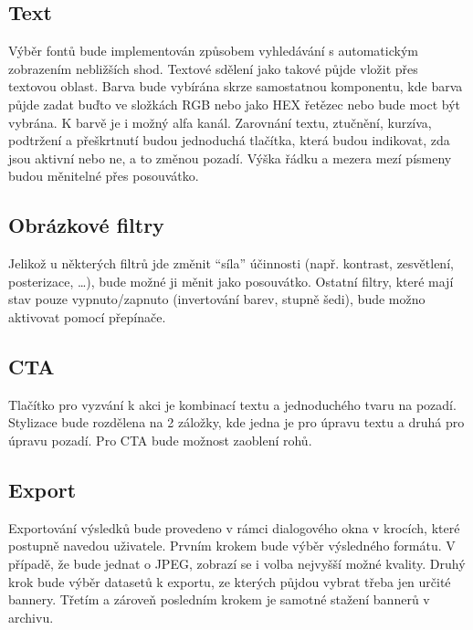         \subsection{Text}
        Výběr fontů bude implementován způsobem vyhledávání s automatickým zobrazením nebližších shod.
        Textové sdělení jako takové půjde vložit přes textovou oblast. Barva bude vybírána skrze samostatnou komponentu, kde barva půjde zadat buďto
        ve složkách RGB nebo jako HEX řetězec nebo bude moct být vybrána. K barvě je i možný alfa kanál.
        Zarovnání textu, ztučnění, kurzíva, podtržení a přeškrtnutí budou jednoduchá tlačítka, která budou indikovat, zda jsou aktivní nebo ne,
        a to změnou pozadí. Výška řádku a mezera mezí písmeny budou měnitelné přes posouvátko.

        \subsection{Obrázkové filtry}
        Jelikož u některých filtrů jde změnit \enquote{síla} účinnosti (např. kontrast, zesvětlení, posterizace, \ldots), bude možné ji měnit jako posouvátko.
        Ostatní filtry, které mají stav pouze vypnuto/zapnuto (invertování barev, stupně šedi), bude možno aktivovat pomocí přepínače.

        \subsection{CTA}
        Tlačítko pro vyzvání k akci je kombinací textu a jednoduchého tvaru na pozadí. Stylizace bude rozdělena na 2 záložky, kde jedna je pro úpravu textu a
        druhá pro úpravu pozadí. Pro CTA bude možnost zaoblení rohů.

        \subsection{Export}
        Exportování výsledků bude provedeno v rámci dialogového okna v krocích, které postupně navedou uživatele.
        Prvním krokem bude výběr výsledného formátu. V případě, že bude jednat o JPEG, zobrazí se i volba nejvyšší možné kvality.
        Druhý krok bude výběr datasetů k exportu, ze kterých půjdou vybrat třeba jen určité bannery. Třetím a zároveň posledním krokem je
        samotné stažení bannerů v archivu. 




\endinput